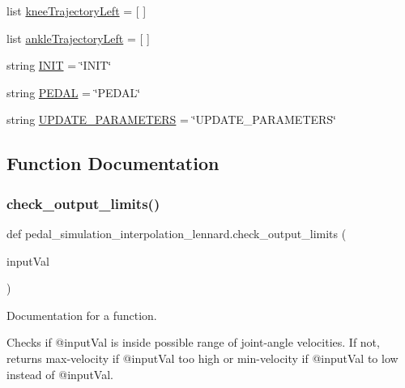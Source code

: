 \begin{DoxyCompactItemize}
list \mbox{\hyperlink{namespacepedal__simulation__interpolation__lennard_a9b3efef6ba899c56876e3f20fbd596c4}{knee\+Trajectory\+Left}} = \mbox{[} \mbox{]}
\item 
list \mbox{\hyperlink{namespacepedal__simulation__interpolation__lennard_afedbe6dd4858c559f464442060f5f766}{ankle\+Trajectory\+Left}} = \mbox{[} \mbox{]}
\item 
string \mbox{\hyperlink{namespacepedal__simulation__interpolation__lennard_a65ee179bf86f324aa779355bff78281d}{I\+N\+IT}} = \char`\"{}I\+N\+IT\char`\"{}
\item 
string \mbox{\hyperlink{namespacepedal__simulation__interpolation__lennard_aa779b19e64f42179ee02615ce7e2bb1a}{P\+E\+D\+AL}} = \char`\"{}P\+E\+D\+AL\char`\"{}
\item 
string \mbox{\hyperlink{namespacepedal__simulation__interpolation__lennard_af25e19966b8c972edbc5b2ae6db79a91}{U\+P\+D\+A\+T\+E\+\_\+\+P\+A\+R\+A\+M\+E\+T\+E\+RS}} = \char`\"{}U\+P\+D\+A\+T\+E\+\_\+\+P\+A\+R\+A\+M\+E\+T\+E\+RS\char`\"{}
\end{DoxyCompactItemize}


\subsection{Function Documentation}
\mbox{\label{namespacepedal__simulation__interpolation__lennard_ac79192f087723dc357712fc70a17d113}} 
\subsubsection{\texorpdfstring{check\_output\_limits()}{check\_output\_limits()}}
{\footnotesize\ttfamily def pedal\+\_\+simulation\+\_\+interpolation\+\_\+lennard.\+check\+\_\+output\+\_\+limits (\begin{DoxyParamCaption}\item[{}]{input\+Val }\end{DoxyParamCaption})}



Documentation for a function. 

Checks if @input\+Val is inside possible range of joint-\/angle velocities. If not, returns max-\/velocity if @input\+Val too high or min-\/velocity if @input\+Val to low instead of @input\+Val. \mbox{\label{namespacepedal__simulation__interpolation__lennard_ad86b44a97e31f2c448d832f4f74c06ca}} 
